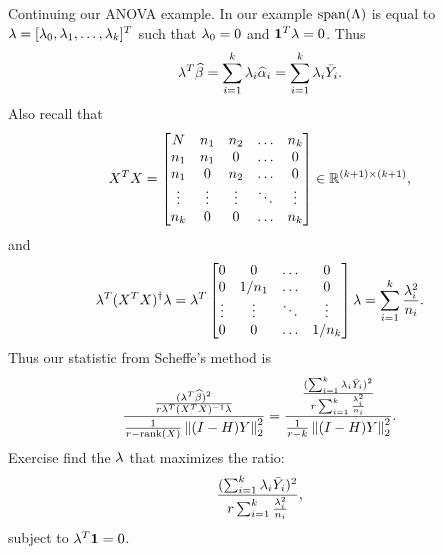 \begin{ex}
    Continuing our ANOVA example. In our example $\operatorname{span}(\Lambda)$ is equal to $\lambda = [\lambda_0,\lambda_1,\ldots, \lambda_k]^T$ such that $\lambda_0=0$ and ${{\bf 1}}^T \lambda =0$. Thus
    \[\lambda^T\widehat{\beta} = \sum_{i=1}^k \lambda_i \widehat{{\alpha}}_i = \sum_{i=1}^k \lambda_i \bar{Y}_i. \]
    Also recall that 
    \[
        X^TX = \begin{bmatrix*}
            N  &n_1&n_2&\ldots& n_k\\
            n_1&n_1&0&\ldots &0\\
            n_1&0  &n_2&\ldots &0\\
            \vdots &\vdots&\vdots &\ddots &\vdots\\
            n_k&0&0&\ldots &n_k
        \end{bmatrix*}\in \R^{(k+1)\times(k+1)},
        \]
        and 
        \[
           \lambda^T(X^TX)^\dagger \lambda = \lambda^T\begin{bmatrix}
                0&0&\ldots &0\\
                0&1/n_1&\ldots &0\\
                \vdots &\vdots & \ddots & \vdots \\
                0&0&\ldots& 1/n_k
            \end{bmatrix} \lambda = \sum_{i=1}^k \frac{\lambda_i^2}{n_i}.
            \]
        Thus our statistic from Scheffe's method is
        \[\frac{
            \frac{(\lambda^T \widehat{\beta})^2}{r\lambda^T(X^TX)^{-1}\lambda}
        }{\frac{1}{r-\text{rank}(X)}\left\|(I-H)Y\right\|_2^2}=\frac{
            \frac{(\sum_{i=1}^k \lambda_i\bar{Y}_i)^2}{r\sum_{i=1}^k \frac{\lambda_i^2}{n_i}}
        }{\frac{1}{r-k}\left\|(I-H)Y\right\|_2^2}. \]
        Exercise find the $\lambda$ that maximizes the ratio: 
        \[ \frac{(\sum_{i=1}^k \lambda_i\bar{Y}_i)^2}{r\sum_{i=1}^k \frac{\lambda_i^2}{n_i}},\]
        subject to $\lambda^T {{\bf 1}} = 0$.
\end{ex}
 